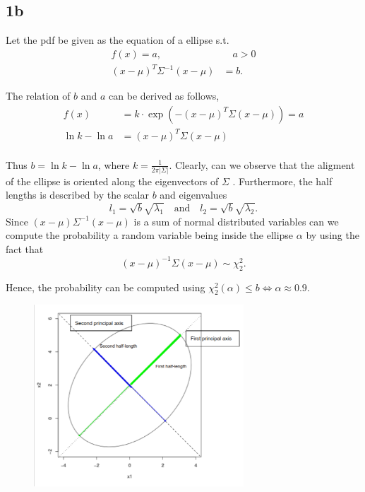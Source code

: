 \documentclass{article}
\theoremstyle{remark}
\begin{document}
\subsection*{ 1b}%
\label{sub:1_b}


Let the pdf be given as the equation of a ellipse s.t. \[
\begin{split}
    f\left( x \right)  = a,& \quad  a>0 \\
    \left( x- \mu  \right)^{T} \Sigma ^{-1} \left( x - \mu  \right) & = b.
\end{split}
\]

The relation of $b$  and $a$ can be derived as follows,\[
    \begin{split}
f\left( x \right) & = k \cdot  \exp \left( - \left( x- \mu  \right)^{T} \Sigma \left( x - \mu  \right) \right) = a \\
\ln k - \ln a &=  \left( x- \mu  \right)^{T} \Sigma  \left( x-\mu  \right) \\
    \end{split}
\]

Thus $b = \ln k - \ln a$, where $\displaystyle k = \frac{1}{2 \pi \left| \Sigma  \right|}$. Clearly, can we observe that
the aligment of the ellipse is oriented along the eigenvectors of $\Sigma $ . Furthermore, the half lengths is described by the
scalar $b$  and eigenvalues \[
    l_{1} = \sqrt{b} \sqrt{\lambda _{1}}  \quad \text{and} \quad  l_{2} =   \sqrt{b}  \sqrt{\lambda _{2}} .
\]
Since $\left( x- \mu  \right) \Sigma ^{-1} \left( x - \mu  \right)$ is a sum of normal distributed variables can we
compute the probability a random variable being inside the ellipse $\alpha $ by using the fact that \[
    \left( x - \mu   \right)^{-1} \Sigma  \left( x - \mu  \right) \sim  \chi _{2} ^{2}.
\]

Hence, the probability can be computed using $\chi _{2}^{2}\left( \alpha   \right) \le b \iff \alpha  \approx 0.9$.



\begin{figure}[H]
    \centering
    \includegraphics[width=0.7\textwidth]{axis.png}
    \label{oppg3}
\end{figure}
\end{document}
